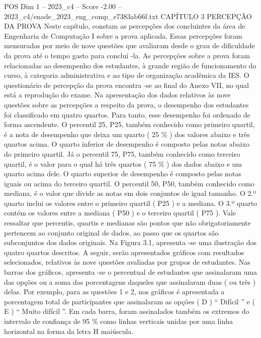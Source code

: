 \begin{textsample}{POS Dim 1 – 2023\_c4 – Score -2.00 – 2023\_c4/enade\_2023\_eng\_comp\_e7383ab66f.txt}  \label{ex:f1_pos_193}
CAPÍTULO 3 PERCEPÇÃO DA PROVA Neste capítulo, constam as percepções dos concluintes da área de Engenharia de Computação I sobre a prova aplicada.
Essas percepções foram mensuradas por meio de nove questões que avaliaram desde o grau de dificuldade da prova até o tempo gasto para concluí -la.
As percepções sobre a prova foram relacionadas ao desempenho dos estudantes, à grande região de funcionamento do curso, à categoria administrativa e ao tipo de organização acadêmica da IES.
O questionário de percepção da prova encontra -se ao final do Anexo VII, no qual está a reprodução do exame.
Na apresentação dos dados relativos às nove questões sobre as percepções a respeito da prova, o desempenho dos estudantes foi classificado em quatro quartos.
Para tanto, esse desempenho foi ordenado de forma ascendente.
O percentil 25, P25, também conhecido como primeiro quartil, é a nota de desempenho que deixa um quarto ( 25 \% ) dos valores abaixo e três quartos acima.
O quarto inferior de desempenho é composto pelas notas abaixo do primeiro quartil.
Já o percentil 75, P75, também conhecido como terceiro quartil, é o valor para o qual há três quartos ( 75 \% ) dos dados abaixo e um quarto acima dele.
O quarto superior de desempenho é composto pelas notas iguais ou acima do terceiro quartil.
O percentil 50, P50, também conhecido como mediana, é o valor que divide as notas em dois conjuntos de igual tamanho.
O 2.º quarto inclui os valores entre o primeiro quartil ( P25 ) e a mediana.
O 3.º quarto contém os valores entre a mediana ( P50 ) e o terceiro quartil ( P75 ).
Vale ressaltar que percentis, quartis e medianas são pontos que não obrigatoriamente pertencem ao conjunto original de dados, ao passo que os quartos são subconjuntos dos dados originais.
Na Figura 3.1, apresenta -se uma ilustração dos quatro quartos descritos.
A seguir, serão apresentados gráficos com resultados selecionados, relativos às nove questões avaliadas por grupos de estudantes.
Nas barras dos gráficos, apresenta -se o percentual de estudantes que assinalaram uma das opções ou a soma das porcentagens daqueles que assinalaram duas ( ou três ) delas.
Por exemplo, para as questões 1 e 2, nos gráficos é apresentada a porcentagem total de participantes que assinalaram as opções ( D ) “ Difícil ” e ( E ) “ Muito difícil ”.
Em cada barra, foram assinalados também os extremos do intervalo de confiança de 95 \% como linhas verticais unidas por uma linha horizontal na forma da letra H maiúscula.

\end{textsample}

